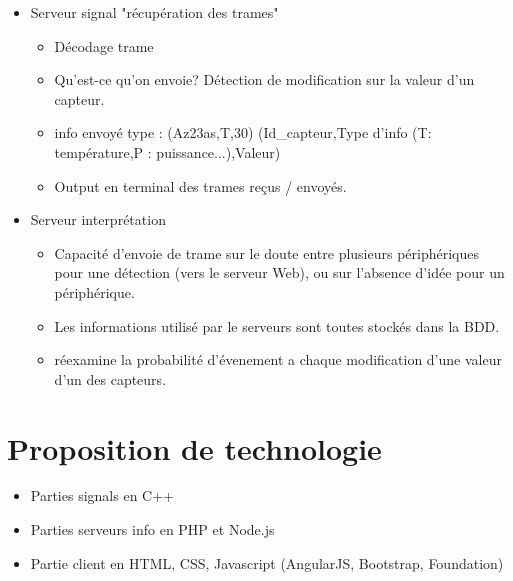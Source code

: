 \documentclass[10pt,a4paper]{article}
\begin{document}
\begin{itemize}
  \item Serveur signal "récupération des trames"
  \begin{itemize}
    \item Décodage trame
    \item Qu'est-ce qu'on envoie? Détection de modification sur la valeur d'un capteur.
    \item info envoyé type : (Az23as,T,30) (Id\_capteur,Type d'info (T: température,P : puissance...),Valeur)
    \item Output en terminal des trames reçus / envoyés.
  \end{itemize}
\end{itemize}

\begin{itemize}
\item Serveur interprétation
\begin{itemize}
  \item Capacité d'envoie de trame sur le doute entre plusieurs périphériques pour une détection (vers le serveur Web), ou sur l'absence d'idée pour un périphérique.
  \item Les informations utilisé par le serveurs sont toutes stockés dans la BDD.
  \item réexamine la probabilité d'évenement a chaque modification d'une valeur d'un des capteurs.
\end{itemize}
\end{itemize}

\section{Proposition de technologie}
\begin{itemize}
\item Parties signals en C++
\item Parties serveurs info en PHP et Node.js
\item Partie client en HTML, CSS, Javascript (AngularJS, Bootstrap, Foundation)
\end{itemize}
\end{document}
